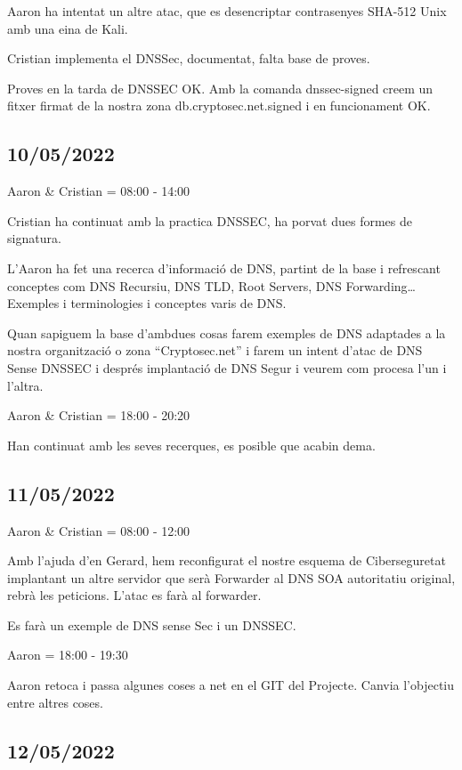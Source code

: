 \documentclass[]{article}
\begin{document}
Aaron ha intentat un altre atac, que es desencriptar contrasenyes
SHA-512 Unix amb una eina de Kali.

Cristian implementa el DNSSec, documentat, falta base de proves.

Proves en la tarda de DNSSEC OK. Amb la comanda dnssec-signed creem un
fitxer firmat de la nostra zona db.cryptosec.net.signed i en
funcionament OK.

\hypertarget{section-12}{%
\subsection{10/05/2022}\label{section-12}}

Aaron \& Cristian = 08:00 - 14:00

Cristian ha continuat amb la practica DNSSEC, ha porvat dues formes de
signatura.

L'Aaron ha fet una recerca d'informació de DNS, partint de la base i
refrescant conceptes com DNS Recursiu, DNS TLD, Root Servers, DNS
Forwarding\ldots{} Exemples i terminologies i conceptes varis de DNS.

Quan sapiguem la base d'ambdues cosas farem exemples de DNS adaptades a
la nostra organització o zona ``Cryptosec.net'' i farem un intent d'atac
de DNS Sense DNSSEC i després implantació de DNS Segur i veurem com
procesa l'un i l'altra.

Aaron \& Cristian = 18:00 - 20:20

Han continuat amb les seves recerques, es posible que acabin dema.

\hypertarget{section-13}{%
\subsection{11/05/2022}\label{section-13}}

Aaron \& Cristian = 08:00 - 12:00

Amb l'ajuda d'en Gerard, hem reconfigurat el nostre esquema de
Ciberseguretat implantant un altre servidor que serà Forwarder al DNS
SOA autoritatiu original, rebrà les peticions. L'atac es farà al
forwarder.

Es farà un exemple de DNS sense Sec i un DNSSEC.

Aaron = 18:00 - 19:30

Aaron retoca i passa algunes coses a net en el GIT del Projecte. Canvia
l'objectiu entre altres coses.

\hypertarget{section-14}{%
\subsection{12/05/2022}\label{section-14}}
\end{document}
